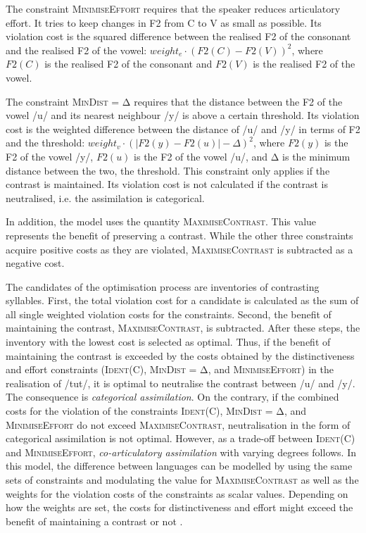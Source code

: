 The constraint \textsc{MinimiseEffort} requires that the speaker reduces articulatory effort. It tries to keep changes in F2 from C to V as small as possible. Its violation cost is the squared difference between the realised F2 of the consonant and the realised F2 of the vowel: $weight_e \cdot (F2(C) - F2(V))^2$, where $F2(C)$ is the realised F2 of the consonant and $F2(V)$ is the realised F2 of the vowel.

The constraint \textsc{MinDist  = Δ} requires that the distance between the F2 of the vowel /u/ and its nearest neighbour /y/ is above a certain threshold. Its violation cost is the weighted difference between the distance of /u/ and /y/ in terms of F2 and the threshold: $weight_v \cdot (|F2(y) - F2(u)| - \Delta)^2$, where $F2(y)$ is the F2 of the vowel /y/, $F2(u)$ is the F2 of the vowel /u/, and Δ is the minimum distance between the two, the threshold. This constraint only applies if the contrast is maintained. Its violation cost is not calculated if the contrast is neutralised, i.e. the assimilation is categorical.

In addition, the model uses the quantity \textsc{MaximiseContrast}. This value represents the benefit of preserving a contrast. While the other three constraints acquire positive costs as they are violated, \textsc{MaximiseContrast} is subtracted as a negative cost.

The candidates of the optimisation process are inventories of contrasting syllables. First, the total violation cost for a candidate is calculated as the sum of all single weighted violation costs for the constraints. Second, the benefit of maintaining the contrast, \textsc{MaximiseContrast}, is subtracted. After these steps, the inventory with the lowest cost is selected as optimal. Thus, if the benefit of maintaining the contrast is exceeded by the costs obtained by the distinctiveness and effort constraints (\textsc{Ident(C)}, \textsc{MinDist = Δ}, and \textsc{MinimiseEffort}) in the realisation of /tut/, it is optimal to neutralise the contrast between /u/ and /y/. The consequence is \emph{categorical assimilation}. On the contrary, if the combined costs for the violation of the constraints \textsc{Ident(C)}, \textsc{MinDist = Δ}, and \textsc{MinimiseEffort} do not exceed \textsc{MaximiseContrast}, neutralisation in the form of categorical assimilation is not optimal. However, as a trade-off between \textsc{Ident(C)} and \textsc{MinimiseEffort}, \emph{co-articulatory assimilation} with varying degrees follows. In this model, the difference between languages can be modelled by using the same sets of constraints and modulating the value for \textsc{MaximiseContrast} as well as the weights for the violation costs of the constraints as scalar values. Depending on how the weights are set, the costs for distinctiveness and effort might exceed the benefit of maintaining a contrast or not \citep{Flemming2001}.

